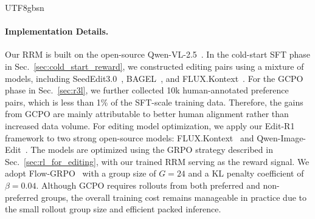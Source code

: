 \documentclass{llmxive}
\providecommand{\rrm}{RRM}
\providecommand{\gcpo}{GCPO}
\providecommand{\grpo}{GRPO}
\providecommand{\editrone}{Edit-R1}
\begin{document}
\begin{CJK*}{UTF8}{gbsn}
\paragraph{Implementation Details.}
Our RRM is built on the open-source Qwen-VL-2.5~\citep{bai2025qwen2}.
In the cold-start SFT phase in Sec.~\ref{sec:cold_start_reward}, we constructed editing pairs using a mixture of models, including SeedEdit3.0~\citep{wang2025seededit}, BAGEL~\citep{deng2025emerging}, and FLUX.Kontext~\citep{batifol2025flux}.
For the \gcpo{} phase in Sec.~\ref{sec:r3l}, we further collected 10k human-annotated preference pairs, which is less than 1\% of the SFT-scale training data. Therefore, the gains from GCPO are mainly attributable to better human alignment rather than increased data volume.
For editing model optimization, we apply our \editrone{} framework to two strong open-source models: FLUX.Kontext~\citep{batifol2025flux} and Qwen-Image-Edit~\citep{wu2025qwen}.
The models are optimized using the \grpo{} strategy described in Sec.~\ref{sec:rl_for_editing}, with our trained \rrm{} serving as the reward signal.
We adopt Flow-GRPO~\citep{liu2025flow} with a group size of $G=24$ and a KL penalty coefficient of $\beta=0.04$.
Although GCPO requires rollouts from both preferred and non-preferred groups, the overall training cost remains manageable in practice due to the small rollout group size and efficient packed inference.

\end{CJK*}
\end{document}
